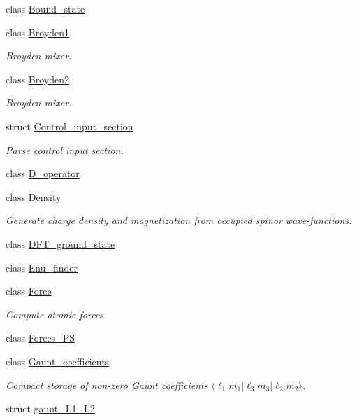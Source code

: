\begin{DoxyCompactItemize}
class \hyperlink{classsirius_1_1_bound__state}{Bound\+\_\+state}
\item 
class \hyperlink{classsirius_1_1_broyden1}{Broyden1}
\begin{DoxyCompactList}\small\item\em Broyden mixer. \end{DoxyCompactList}\item 
class \hyperlink{classsirius_1_1_broyden2}{Broyden2}
\begin{DoxyCompactList}\small\item\em Broyden mixer. \end{DoxyCompactList}\item 
struct \hyperlink{structsirius_1_1_control__input__section}{Control\+\_\+input\+\_\+section}
\begin{DoxyCompactList}\small\item\em Parse control input section. \end{DoxyCompactList}\item 
class \hyperlink{classsirius_1_1_d__operator}{D\+\_\+operator}
\item 
class \hyperlink{classsirius_1_1_density}{Density}
\begin{DoxyCompactList}\small\item\em Generate charge density and magnetization from occupied spinor wave-\/functions. \end{DoxyCompactList}\item 
class \hyperlink{classsirius_1_1_d_f_t__ground__state}{D\+F\+T\+\_\+ground\+\_\+state}
\item 
class \hyperlink{classsirius_1_1_enu__finder}{Enu\+\_\+finder}
\item 
class \hyperlink{classsirius_1_1_force}{Force}
\begin{DoxyCompactList}\small\item\em Compute atomic forces. \end{DoxyCompactList}\item 
class \hyperlink{classsirius_1_1_forces___p_s}{Forces\+\_\+\+P\+S}
\item 
class \hyperlink{classsirius_1_1_gaunt__coefficients}{Gaunt\+\_\+coefficients}
\begin{DoxyCompactList}\small\item\em Compact storage of non-\/zero Gaunt coefficients $ \langle \ell_1 m_1 | \ell_3 m_3 | \ell_2 m_2 \rangle $. \end{DoxyCompactList}\item 
struct \hyperlink{structsirius_1_1gaunt___l1___l2}{gaunt\+\_\+\+L1\+\_\+\+L2}

\end{DoxyCompactItemize}
